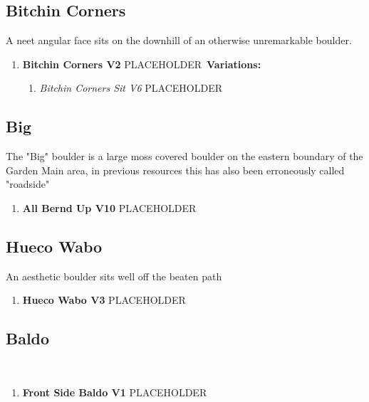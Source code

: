 \subsection*{Bitchin Corners}\label{bf:Bitchin Corners}
A neet angular face sits on the downhill of an otherwise unremarkable boulder.

\begin{enumerate}[]
	\item\label{rt:Bitchin Corners} \colorbox{green!20}{\textbf{Bitchin Corners V2  } }
	\newline PLACEHOLDER\
	\newline \textbf{Variations:}
	\begin{enumerate}
		\item\label{vr:Bitchin Corners Sit} \colorbox{Goldenrod!50}{\emph{Bitchin Corners Sit V6  }  }
		\newline PLACEHOLDER\
	\end{enumerate}
\end{enumerate}
\subsection*{Big}\label{bf:Big}
The "Big" boulder is a large moss covered boulder on the eastern boundary of the Garden Main area, in previous resources this has also been erroneously called "roadside"

\begin{enumerate}[resume]
	\item\label{rt:All Bernd Up} \colorbox{red!20}{\textbf{All Bernd Up V10  } }
	\newline PLACEHOLDER\
\end{enumerate}
\subsection*{Hueco Wabo}\label{bf:Hueco Wabo}
An aesthetic boulder sits well off the beaten path

\begin{enumerate}[resume]
	\item\label{rt:Hueco Wabo} \colorbox{green!20}{\textbf{Hueco Wabo V3  } }
	\newline PLACEHOLDER\
\end{enumerate}
\subsection*{Baldo}\label{bf:Baldo}
\

\begin{enumerate}[resume]
	\item\label{rt:Front Side Baldo} \colorbox{green!20}{\textbf{Front Side Baldo V1  } }
	\newline PLACEHOLDER\
\end{enumerate}
